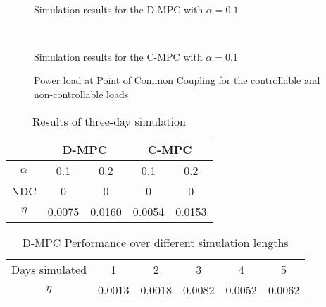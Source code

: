 \begin{figure}[!t]
\centering
{}
\\
\caption{Simulation results for the D-MPC with $\alpha=0.1$}
\label{fig:dmpcsimres}
\end{figure}

\begin{figure}[!t]
\centering
{}
\\
\centering
\caption{Simulation results for the C-MPC with $\alpha=0.1$}
\label{fig:cmpcsimres}
\end{figure}

\begin{figure}[!t]
\centering
\caption{Power load at Point of Common Coupling for the controllable and non-controllable loads}
\label{fig:pccsimres}
\end{figure}

\begin{table}
\caption{Results of three-day simulation}\label{tab:comparison}
\centering
\begin{tabular}{c|c c c c}
\hline
&\multicolumn{2}{c}{D-MPC} & \multicolumn{2}{c}{C-MPC} \\
\hline
$\alpha$ & 0.1 &0.2&0.1&0.2\\
NDC&0 &0 &0 &0\\
$\eta$&0.0075 &0.0160&0.0054&0.0153\\
\hline
\end{tabular}
\end{table}

\begin{table}
	\caption{D-MPC Performance over different simulation lengths}\label{tab:days}
	\centering
\begin{tabular}{c|c c c c c}
\hline
Days simulated & 1 & 2 & 3 & 4 & 5 \\
$\eta$ &0.0013&0.0018 &0.0082&0.0052&0.0062\\
\hline
\end{tabular}
\end{table}
